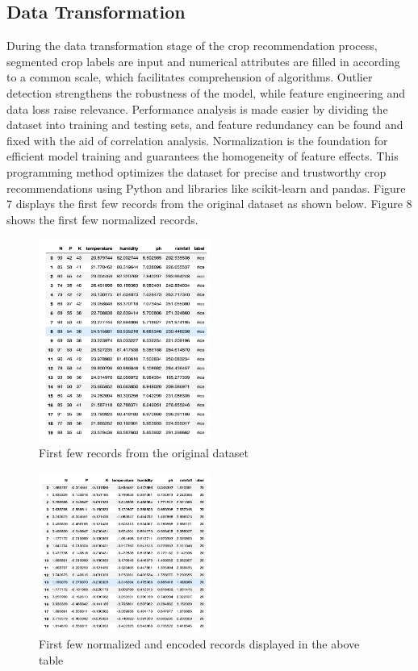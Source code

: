 \subsection {Data Transformation}
During the data transformation stage of the crop recommendation process, segmented crop labels are input and numerical attributes are filled in according to a common scale, which facilitates comprehension of algorithms. Outlier detection strengthens the robustness of the model, while feature engineering and data loss raise relevance. Performance analysis is made easier by dividing the dataset into training and testing sets, and feature redundancy can be found and fixed with the aid of correlation analysis. Normalization is the foundation for efficient model training and guarantees the homogeneity of feature effects. This programming method optimizes the dataset for precise and trustworthy crop recommendations using Python and libraries like scikit-learn and pandas. Figure 7 displays the first few records from the original dataset as shown below. Figure 8 shows the first few normalized records.

\begin{figure}[h]
    \centering
    \includegraphics[width=0.5\textwidth]{visual 4.png}
    \caption{First few records from the original dataset}
    \label{fig:my_label}
    
\end{figure}

\begin{figure}[h]
    \centering
    \includegraphics[width=0.5\textwidth]{visual 5.png}
    \caption{First few normalized and encoded records displayed in the above table}
    \label{fig:my_label}
    
\end{figure}


